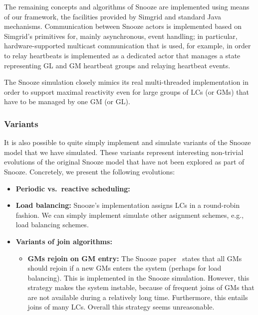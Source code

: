 The remaining concepts and algorithms of Snooze are implemented using
means of our framework, the facilities provided by Simgrid and
standard Java mechanisms. Communication between Snooze actors is
implemented based on Simgrid's primitives for, mainly asynchronous,
event handling; in particular, hardware-supported multicast
communication that is used, for example, in order to relay heartbeats
is implemented as a dedicated actor that manages a state representing
GL and GM heartbeat groups and relaying heartbeat events.

The Snooze simulation closely mimics its real multi-threaded
implementation in order to support maximal reactivity even for large
groups of LCs (or GMs) that have to be managed by one GM (or GL).

\subsubsection{Variants}

It is also possible to quite simply implement and simulate variants of
the Snooze model that we have simulated. These variants represent
interesting non-trivial evolutions of the original Snooze model that
have not been explored as part of Snooze. Concretely, we present the
following evolutions:

\begin{itemize}
  \item \textbf{Periodic vs.\ reactive scheduling:} 
  \item \textbf{Load balancing:} Snooze's implementation assigns LCs
    in a round-robin fashion. We can simply implement simulate other
    asignment schemes, e.g., load balancing schemes.
  \item \textbf{Variants of join algorithms:}
    \begin{itemize}
      \item \textbf{GMs rejoin on GM entry:} The Snooze
        paper~\cite{feller:ccgrid12} states that all GMs should rejoin if a new
        GMs enters the system (perhaps for load balancing). This is
        implemented in the Snooze simulation. However, this strategy
        makes the system instable, because of frequent joins of GMs
        that are not available during a relatively long
        time. Furthermore, this entails joins of many LCs. Overall
        this strategy seems unreasonable.
    \end{itemize}
\end{itemize}




